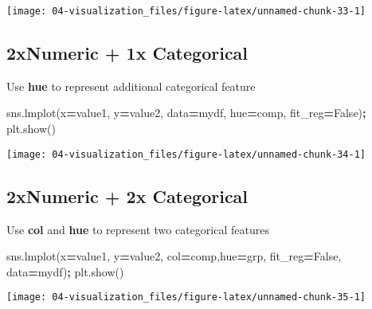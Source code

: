 \documentclass[
]{book}
\newenvironment{Shaded}{\begin{snugshade}}{\end{snugshade}}
\newcommand{\NormalTok}[1]{#1}
\newcommand{\OperatorTok}[1]{\textcolor[rgb]{0.43,0.43,0.43}{\textbf{#1}}}
\newcommand{\StringTok}[1]{\textcolor[rgb]{0.5,0.5,0.5}{#1}}
\newcommand{\VariableTok}[1]{\textcolor[rgb]{0,0,0}{#1}}
\begin{document}
\texttt{[image: 04-visualization\_files/figure-latex/unnamed-chunk-33-1]}

\hypertarget{xnumeric-1x-categorical}{%
\subsection{2xNumeric + 1x Categorical}\label{xnumeric-1x-categorical}}

Use \textbf{hue} to represent additional categorical feature

\begin{Shaded}
\begin{Highlighting}[]
\NormalTok{sns.lmplot(x}\OperatorTok{=}\StringTok{\textquotesingle{}value1\textquotesingle{}}\NormalTok{, y}\OperatorTok{=}\StringTok{\textquotesingle{}value2\textquotesingle{}}\NormalTok{, data}\OperatorTok{=}\NormalTok{mydf, hue}\OperatorTok{=}\StringTok{\textquotesingle{}comp\textquotesingle{}}\NormalTok{, fit\_reg}\OperatorTok{=}\VariableTok{False}\NormalTok{)}\OperatorTok{;}
\NormalTok{plt.show()}
\end{Highlighting}
\end{Shaded}

\texttt{[image: 04-visualization\_files/figure-latex/unnamed-chunk-34-1]}

\hypertarget{xnumeric-2x-categorical}{%
\subsection{2xNumeric + 2x Categorical}\label{xnumeric-2x-categorical}}

Use \textbf{col} and \textbf{hue} to represent two categorical features

\begin{Shaded}
\begin{Highlighting}[]
\NormalTok{sns.lmplot(x}\OperatorTok{=}\StringTok{\textquotesingle{}value1\textquotesingle{}}\NormalTok{, y}\OperatorTok{=}\StringTok{\textquotesingle{}value2\textquotesingle{}}\NormalTok{, col}\OperatorTok{=}\StringTok{\textquotesingle{}comp\textquotesingle{}}\NormalTok{,hue}\OperatorTok{=}\StringTok{\textquotesingle{}grp\textquotesingle{}}\NormalTok{, fit\_reg}\OperatorTok{=}\VariableTok{False}\NormalTok{, data}\OperatorTok{=}\NormalTok{mydf)}\OperatorTok{;}
\NormalTok{plt.show()}
\end{Highlighting}
\end{Shaded}

\texttt{[image: 04-visualization\_files/figure-latex/unnamed-chunk-35-1]}
\end{document}
